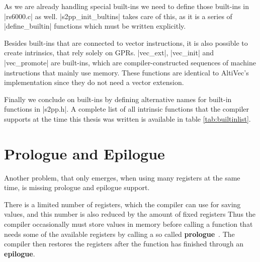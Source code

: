 As we are already handling special built-ins we need to define those built-ins in |rs6000.c| as well.
|s2pp_init_bultins| takes care of this, as it is a series of |define_builtin| functions which must be written explicitly.

Besides built-ins that are connected to vector instructions, it is also possible to create intrinsics, that rely solely on GPRs.
|vec_ext|, |vec_init| and |vec_promote| are built-ins, which are compiler-constructed sequences of machine instructions that mainly use memory.
These functions are identical to AltiVec's implementation since they do not need a vector extension.

Finally we conclude on built-ins by defining alternative names for built-in functions in |s2pp.h|.
A complete list of all intrinsic functions that the compiler supports at the time this thesis was written is available in table \ref{tab:builtinlist}.

\section{Prologue and Epilogue}
Another problem, that only emerges, when using many registers at the same time, is missing prologue and epilogue support.

There is a limited number of registers, which the compiler can use for saving values, and this number is also reduced by the amount of fixed registers
Thus the compiler occasionally must store values in memory before calling a function that needs some of the available registers by calling a so called \textbf{prologue}~\citep[ch.~17.9.11]{GCCint}.
The compiler then restores the registers after the function has finished through an \textbf{epilogue}.

